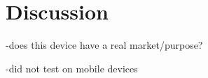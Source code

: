\section{Discussion}
\label{sec:discussion}

-does this device have a real market/purpose?

-did not test on mobile devices
